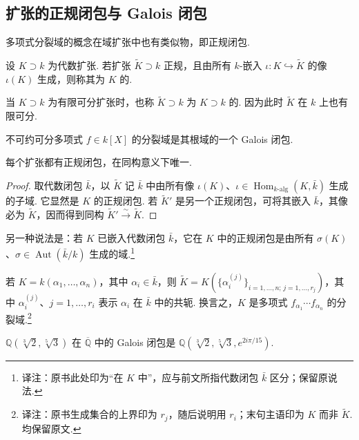 \subsection{扩张的正规闭包与 Galois 闭包}\label{sec:galois-2-7-10}
多项式分裂域的概念在域扩张中也有类似物，即正规闭包.
\begin{definition*}设 $K\supset k$ 为代数扩张. 若扩张 $\widetilde K\supset k$ 正规，且由所有 $k$-嵌入 $\iota:K\hookrightarrow\widetilde K$ 的像 $\iota(K)$ 生成，则称其为 $K$ 的.\end{definition*}
当 $K\supset k$ 为有限可分扩张时，也称 $\widetilde K\supset k$ 为 $K\supset k$ 的. 因为此时 $\widetilde K$ 在 $k$ 上也有限可分.
\begin{example*}不可约可分多项式 $f\in k[X]$ 的分裂域是其根域的一个 Galois 闭包.\end{example*}
\begin{proposition*}每个扩张都有正规闭包，在同构意义下唯一.\end{proposition*}
\begin{proof}取代数闭包 $\bar k$，以 $\widetilde K$ 记 $\bar k$ 中由所有像 $\iota(K)$、$\iota\in\operatorname{Hom}_{k\text{-alg}}(K,\bar k)$ 生成的子域. 它显然是 $K$ 的正规闭包. 若 $\widetilde K'$ 是另一个正规闭包，可将其嵌入 $\bar k$，其像必为 $\widetilde K$，因而得到同构 $\widetilde K'\xrightarrow{\sim}\widetilde K$.\end{proof}
另一种说法是：若 $K$ 已嵌入代数闭包 $\bar k$，它在 $K$ 中的正规闭包是由所有 $\sigma(K)$、$\sigma\in\operatorname{Aut}(\bar k/k)$ 生成的域.\footnote{译注：原书此处印为``在 $K$ 中''，应与前文所指代数闭包 $\bar k$ 区分；保留原说法.}
\begin{example*}若 $K=k(\alpha_1,\ldots,\alpha_n)$，其中 $\alpha_i\in\bar k$，则 $\widetilde K=K(\{\alpha_i^{(j)}\}_{i=1,\ldots,n;\,j=1,\ldots,r_j})$，其中 $\alpha_i^{(j)}$、$j=1,\ldots,r_i$ 表示 $\alpha_i$ 在 $\bar k$ 中的共轭. 换言之，$K$ 是多项式 $f_{\alpha_1}\cdots f_{\alpha_n}$ 的分裂域.\footnote{译注：原书生成集合的上界印为 $r_j$，随后说明用 $r_i$；末句主语印为 $K$ 而非 $\widetilde K$. 均保留原文.}\end{example*}
\begin{example*}$\mathbb Q(\sqrt[3]2,\sqrt[5]3)$ 在 $\overline{\mathbb Q}$ 中的 Galois 闭包是 $\mathbb Q(\sqrt[3]2,\sqrt[5]3,e^{2i\pi/15})$.\end{example*}



